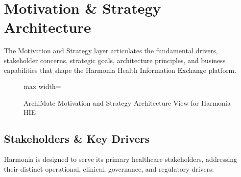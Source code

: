
\chapter{Motivation \& Strategy Architecture}
\label{chap:motivation_strategy}

The Motivation and Strategy layer articulates the fundamental drivers, stakeholder concerns, strategic goals, architecture principles, and business capabilities that shape the Harmonia Health Information Exchange platform.

\begin{figure}[htbp]
    \centering
    \begin{adjustbox}{max width=\textwidth}
        
    \end{adjustbox}
    \caption{ArchiMate Motivation and Strategy Architecture View for Harmonia HIE}
    \label{fig:motivation_map}
\end{figure}

\section{Stakeholders \& Key Drivers}

Harmonia is designed to serve its primary healthcare stakeholders, addressing their distinct operational, clinical, governance, and regulatory drivers:

